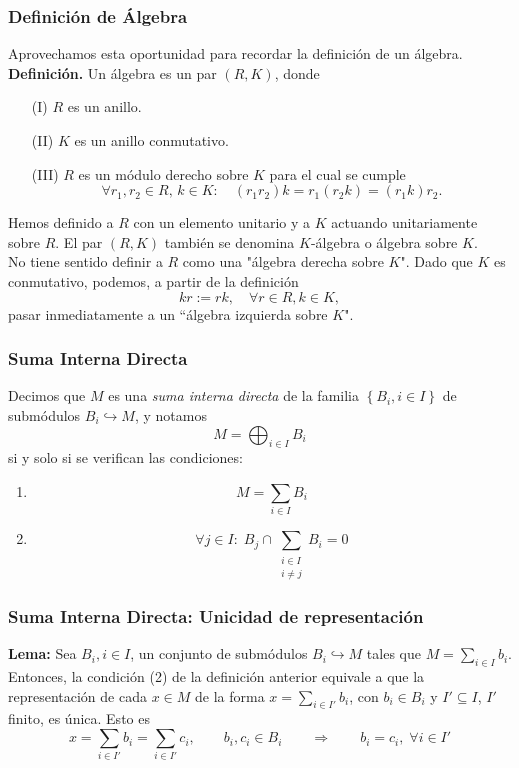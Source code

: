 \documentclass[notes=show]{beamer}%
\begin{document}
\begin{frame}
    \frametitle{Definición de Álgebra}
    Aprovechamos esta oportunidad para recordar la definición de un álgebra.\\
    
    \textbf{Definición.} Un álgebra es un par \( (R, K) \), donde
    \begin{enumerate}
        \item[(I)] \( R \) es un anillo.
        \item[(II)] \( K \) es un anillo conmutativo.
        \item[(III)] \( R \) es un módulo derecho sobre \( K \) para el cual se cumple
        \[
        \forall r_1, r_2 \in R, \, k \in K: \quad (r_1 r_2) k = r_1 (r_2 k) = (r_1 k) r_2.
        \]
    \end{enumerate}


    Hemos definido a \( R \) con un elemento unitario y a \( K \) actuando unitariamente sobre \( R \). 
    El par \( (R, K) \) también se denomina \( K \)-álgebra o álgebra sobre \( K \).\\
    No tiene sentido definir a \( R \) como una "álgebra derecha sobre \( K \)". Dado que \( K \) es conmutativo, podemos, a partir de la definición
    \[
    kr := rk, \quad \forall r \in R, k \in K,
    \]
    pasar inmediatamente a un ``álgebra izquierda sobre \( K \)".
    
\end{frame}

\begin{frame}
    \frametitle{Suma Interna Directa}
    Decimos que \(M\) es una \textit{suma interna directa} de la familia \(\left\{ B_i, i\in I \right\}\) de submódulos \(B_i \hookrightarrow M\), 
    y notamos 
    \[M = \bigoplus_{i\in I} B_i \]
    si y solo si se verifican las condiciones:
    \begin{enumerate}
        \item \[ M = \sum_{i\in I} B_i \]
        \item \[ \forall j \in I: \; B_j \cap \sum_{\substack{i\in I \\ i \neq j }} B_i = 0\]
    \end{enumerate}
\end{frame}

\begin{frame}
    \frametitle{Suma Interna Directa: Unicidad de representación}
    \textbf{Lema:} Sea \(B_i, i\in I\), un conjunto de submódulos \(B_i\hookrightarrow M\) tales que
    \(M = \sum_{i\in I} b_i\). Entonces, la condición (2) de la definición anterior equivale a que la 
    representación de cada \(x\in M\) de la forma \(x = \sum_{i\in I'} b_i\), con \(b_i \in B_i\) y
    \(I'\subseteq I\), \(I'\) finito, es única. Esto es
    \[ x =  \sum_{i\in I'} b_i = \sum_{i\in I'} c_i, \qquad b_i,c_i\in B_i \qquad \Rightarrow \qquad b_i = c_i, \; \forall i\in I'\]

\end{frame}
\end{document}
